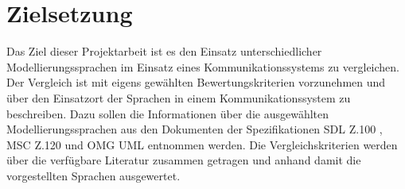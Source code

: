 \section{Zielsetzung}
\label{sc:Zielsetzung}
Das Ziel dieser Projektarbeit ist es den Einsatz unterschiedlicher Modellierungssprachen im Einsatz eines Kommunikationssystems zu vergleichen. Der Vergleich ist mit eigens gewählten Bewertungskriterien vorzunehmen und über den Einsatzort der Sprachen in einem Kommunikationssystem zu beschreiben. Dazu sollen die Informationen über die ausgewählten Modellierungssprachen aus den Dokumenten der Spezifikationen \acs{SDL} Z.100 \cite{ITUT100_2016}, \acs{MSC} Z.120 \cite{ITUT120_2011} und OMG \acs{UML} \cite{UML_2016} entnommen werden. Die Vergleichskriterien werden über die verfügbare Literatur zusammen getragen und anhand damit die vorgestellten Sprachen ausgewertet.
